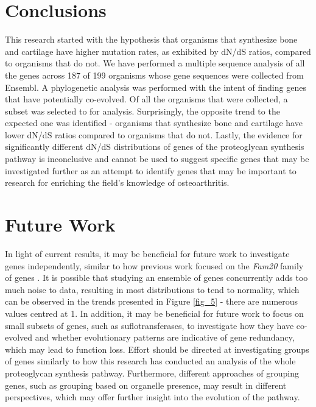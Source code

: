 \documentclass{article}
\begin{document}
\section{Conclusions}
This research started with the hypothesis that organisms that synthesize bone and cartilage have higher mutation rates, as exhibited by dN/dS ratios, compared to organisms that do not. We have performed a multiple sequence analysis of all the genes across 187 of 199 organisms whose gene sequences were collected from Ensembl. A phylogenetic analysis was performed with the intent of finding genes that have potentially co-evolved. Of all the organisms that were collected, a subset was selected to for analysis. Surprisingly, the opposite trend to the expected one was identified - organisms that synthesize bone and cartilage have lower dN/dS ratios compared to organisms that do not. Lastly, the evidence for significantly different dN/dS distributions of genes of the proteoglycan synthesis pathway is inconclusive and cannot be used to suggest specific genes that may be investigated further as an attempt to identify genes that may be important to research for enriching the field's knowledge of osteoarthritis. 

\section{Future Work}
In light of current results, it may be beneficial for future work to investigate genes independently, similar to how previous work focused on the \textit{Fam20} family of genes \cite{fam20}. It is possible that studying an ensemble of genes concurrently adds too much noise to data, resulting in most distributions to tend to normality, which can be observed in the trends presented in Figure \ref{fig_5} - there are numerous values centred at 1. In addition, it may be beneficial for future work to focus on small subsets of genes, such as suflotransferases, to investigate how they have co-evolved and whether evolutionary patterns are indicative of gene redundancy, which may lead to function loss. Effort should be directed at investigating groups of genes similarly to how this research has conducted an analysis of the whole proteoglycan synthesis pathway. Furthermore, different approaches of grouping genes, such as grouping based on organelle presence, may result in different perspectives, which may offer further insight into the evolution of the pathway. 



\end{document}
